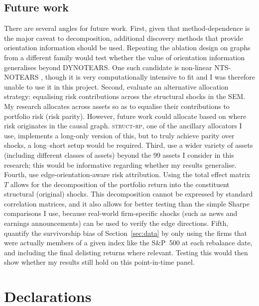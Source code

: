 \documentclass[11pt, a4paper]{report}
\newcommand{\structrp}{\textsc{struct-rp}}
\begin{document}
\section{Future work}
\label{sec:future}

There are several angles for future work.
First, given that method-dependence is the major caveat to decomposition, additional discovery methods that provide orientation information should be used.
Repeating the ablation design on graphs from a different family
would test whether the value of orientation information generalises beyond DYNOTEARS. One such candidate is
non-linear NTS-NOTEARS \cite{sun2023ntsnotears}, though it is very computationally intensive to fit and I was therefore unable to use it in this project.
Second, evaluate an alternative allocation strategy: equalising risk contributions across the structural shocks in the SEM. My research allocates across assets so as to equalise their contributions to portfolio risk (risk parity). However, future work could allocate based on where risk originates in the causal graph. \structrp{}, one of the ancillary allocators I use, implements a long-only version of this, but to truly achieve parity over shocks, a long--short setup would be required.
Third, use a wider variety of assets (including different classes of assets) beyond the 99 assets I consider in this research; this would be informative regarding whether my results generalise.
Fourth, use edge-orientation-aware risk attribution. Using the total effect matrix $T$ allows for the decomposition of the portfolio return into the constituent structural (original) shocks. This decomposition cannot be expressed by standard correlation matrices, and it also allows for better testing than the simple Sharpe comparisons I use, because real-world firm-specific shocks (such as news and earnings announcements) can be used to verify the edge directions.
Fifth, quantify the survivorship
bias of Section~\ref{sec:data} by only using the firms that were actually members of a given index like the S\&P~500 at each rebalance date, and including the final delisting returns where relevant. Testing this would then show whether my results still hold on this point-in-time panel.

\clearpage
\printbibliography[heading=bibintoc, title={References}]

\chapter*{Declarations}
\end{document}
